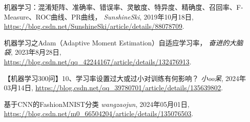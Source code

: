 \documentclass[10.5pt,compsoc,UTF8]{CjC}
\theoremstyle{mystyle}
\begin{document}
\begin{thebibliography}{99}
   \addtolength{\itemsep}{-1em}
  \vspace {1.5mm}
  
  机器学习：混淆矩阵、准确率、错误率、灵敏度、特异度、精确度、召回率、F-Measure、ROC曲线、PR曲线，
  \textit{SunshineSki},
  2019年10月18日,
  \url{https://blog.csdn.net/SunshineSki/article/details/88078709}.
  
  机器学习之Adam（Adaptive Moment Estimation）自适应学习率，
  \textit{奋进的大脑袋},
  2023年8月28日,
  \url{https://blog.csdn.net/qq_42244167/article/details/132476913}.

  【机器学习300问】10、学习率设置过大或过小对训练有何影响？
  \textit{小oo呆},
  2024年03月14日,
  \url{https://blog.csdn.net/qq_39780701/article/details/135639802}.

  基于CNN的FashionMNIST分类
  \textit{wangzaojun},
  2024年05月01日,
  \url{https://blog.csdn.net/m0_66504204/article/details/135076503}.

\end{thebibliography}
\end{document}

